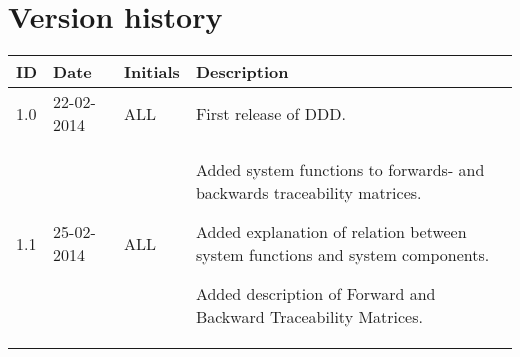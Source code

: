 \documentclass[Main]{subfiles}
\begin{document}
\section*{Version history}

\begin{tabular}{p{} p{} p{} p{}}
\hline
\textbf{ID} & \textbf{Date} & \textbf{Initials} & \textbf{Description}
\\
\hline
1.0 & 22-02-2014 & ALL & First release of DDD.
\\
1.1 & 25-02-2014 & ALL & Added  system functions to forwards- and backwards traceability matrices.

Added explanation of relation between system functions and system components.

Added description of Forward and Backward Traceability Matrices.

\\\hline 
\end{tabular} 
\end{document}
